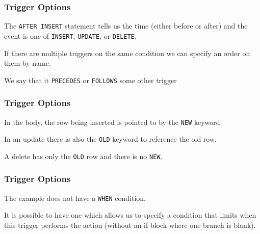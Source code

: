 \begin{frame}
\frametitle{Trigger Options}

The \texttt{AFTER INSERT} statement tells us the time (either before or after) and the event is one of \texttt{INSERT}, \texttt{UPDATE}, or \texttt{DELETE}.


If there are multiple triggers on the same condition we can specify an order on them by name. 

We say that it \texttt{PRECEDES} or \texttt{FOLLOWS} some other trigger

\end{frame}

\begin{frame}
\frametitle{Trigger Options}

In the body, the row being inserted is pointed to by the \texttt{NEW} keyword. 

In an update there is also the \texttt{OLD} keyword to reference the old row. 

A delete has only the \texttt{OLD} row and there is no \texttt{NEW}.


\end{frame}

\begin{frame}
\frametitle{Trigger Options}

The example does not have a \texttt{WHEN} condition. 

It is possible to have one which allows us to specify a condition that limits when this trigger performs the action (without an if block where one branch is blank). 



\end{frame}







